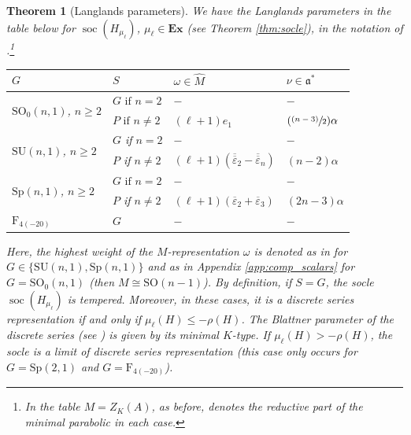 \documentclass[JEP,XML,SOM,NoFloatCountersInSection,Unicode,published]{cedram}
\newcommand{\psfrac}[2]{\sfrac{(#1)}{#2}}
\newtheorem{theorem}{Theorem}[section]
\theoremstyle{definition}
\newcommand{\mf}[1]{\ensuremath{\mathfrak{#1}}}
\newcommand{\on}[1]{\ensuremath{\operatorname{#1}}}
\newcommand{\rhoa}{\ensuremath{\rho}}
\newcommand{\pst}[1]{\ensuremath{H_{#1}}}
\newcommand{\GSO}[1]{\ensuremath{\mathrm{SO}_0(#1,1)}}
\newcommand{\GSU}[1]{\ensuremath{\mathrm{SU}(#1,1)}}
\newcommand{\GSp}[1]{\ensuremath{\mathrm{Sp}(#1,1)}}
\newcommand{\GF}{\ensuremath{\mathrm{F}_{4(-20)}}}
\begin{document}
\begin{theorem}[Langlands parameters]\label{thm:langlands}
We have the Langlands parameters in the table below for $\on{soc}(\pst{\mu_\ell})$, $\mu_\ell\in\mathbf{Ex}$ (see Theorem \ref{thm:socle}), in the notation of \cite[Th.\,8.54]{Kna86}.\footnote{In the table $M=Z_K(A)$, as before, denotes the reductive part of the \emph{minimal} parabolic in each case.}
\begin{table}[htb]
\begin{center}
\def\arraystretch{1.2}
\setlength{\tabcolsep}{13pt}
\begin{tabular}{l|lll}
$G$&$S$& $\omega\in\hat M$&$\nu\in\mf a^*$\\\hline
\multirow{2}{*}{$\GSO{n}$, $n\geq2$}&$G\text{ if }n=2$&$-$&$-$\\
&$P\text{ if }n\neq2$&$(\ell+1)e_1$&$(\psfrac{n-3}{2})\alpha$\\\hline
\multirow{2}{*}{$\GSU{n}$, $n\geq2$}&$G$ if $n=2$&$-$&$-$\\
&$P$ if $n\neq2$&$(\ell+1)(\overline{\overline{\varepsilon}}_2-\overline{\overline{\varepsilon}}_n)$&$(n-2)\alpha$\\\hline
\multirow{2}{*}{$\GSp{n}$, $n\geq2$}&$G\text{ if }n=2$&$-$&$-$\\
&$P$ if $n\neq2$&$(\ell+1)(\overline{\varepsilon}_2+\overline{\varepsilon}_3)$&$(2n-3)\alpha$\\\hline
\GF&$G$&$-$&$-$
\end{tabular}
\end{center}
\end{table}
Here, the highest weight of the $M$-representation $\omega$ is denoted as in \cite[Lem.\,4.3, 5.3]{B79} for $G\in\{\GSU{n},\GSp{n}\}$ and as in Appendix \ref{app:comp_scalars} for $G=\GSO{n}$ (then $M\cong\mathrm{SO}(n-1)$). By definition, if $S=G$, the socle $\on{soc}(\pst{\mu_\ell})$ is tempered. Moreover, in these cases, it is a discrete series representation if and only if $\mu_\ell(H)\leq-\rhoa(H)$. The Blattner parameter of the discrete series (see \cite[Terminology p.\,310]{Kna86}) is given by its minimal $K$-type. If $\mu_\ell(H)>-\rhoa(H)$, the socle is a limit of discrete series representation (this case only occurs for $G=\GSp{2}$ and $G=\GF$).
\end{theorem}
\end{document}
